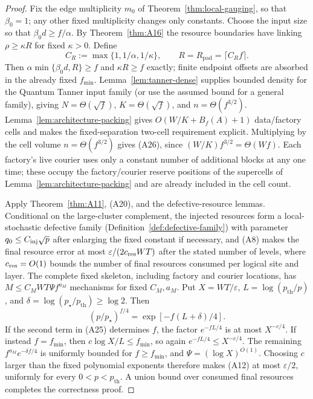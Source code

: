 \documentclass[aps,prx,reprint,superscriptaddress,nofootinbib,floatfix,longbibliography]{revtex4-2}
\theoremstyle{definition}
\begin{document}
\begin{proof}
Fix the edge multiplicity $m_0$ of Theorem~\ref{thm:local-gauging}, so that
$\beta_0=1$; any other fixed multiplicity changes only constants.  Choose the
input size so that $\beta_0d\ge f/\alpha$.  By
Theorem~\ref{thm:A16} the resource boundaries have linking
$\rho\geq\kappa R$ for fixed $\kappa>0$.  Define
\begin{equation*}
 C_R:=\max\{1,1/\alpha,1/\kappa\},\qquad
 R=R_{\mathrm{pad}}=\lceil C_R f\rceil .
\end{equation*}
Then $\alpha\min\{\beta_0d,R\}\ge f$ and $\kappa R\ge f$
exactly; finite endpoint offsets are absorbed in the already fixed
$f_{\min}$.
  Lemma~\ref{lem:tanner-dense} supplies bounded density for the
Quantum Tanner input family (or use the assumed bound for a general family),
giving $N=\Theta(\sqrt f)$, $K=\Theta(\sqrt f)$, and
$n=\Theta(f^{3/2})$.  Lemma~\ref{lem:architecture-packing} gives
$O(W/K+B_f(A)+1)$ data/factory cells and makes the fixed-separation two-cell
requirement explicit.  Multiplying by the cell volume $n=\Theta(f^{3/2})$
gives (A26), since $(W/K)f^{3/2}=\Theta(Wf)$.  Each factory's live courier uses only
a constant number of additional blocks at any one time; these occupy the
factory/courier reserve positions of the supercells of
Lemma~\ref{lem:architecture-packing} and are already included in the cell count.

Apply Theorem~\ref{thm:A11}, (A20), and the defective-resource lemmas.
Conditional on the large-cluster complement, the injected resources form a
local-stochastic defective family (Definition~\ref{def:defective-family})
with parameter $q_0\le C_{\rm inj}\sqrt p$ after enlarging the fixed constant
if necessary, and (A8) makes the final resource error at most
$\varepsilon/(2c_{\rm res}WT)$ after the stated number of levels, where
$c_{\rm res}=O(1)$ bounds the number of final resources consumed per logical
site and layer.  The complete
fixed skeleton, including factory and courier locations, has
$M\leq C_MWT\Psi f^{a_M}$ mechanisms for fixed $C_M,a_M$.  Put
$X=WT/\varepsilon$, $L=\log(p_{\mathrm{th}}/p)$, and
$\delta=\log(p_\star/p_{\mathrm{th}})\geq\log2$.  Then
\begin{equation}
 (p/p_\star)^{f/4}=\exp[-f(L+\delta)/4].                            \tag{A28}
\end{equation}
If the second term in (A25) determines $f$, the factor $e^{-fL/4}$
is at most $X^{-c/4}$.  If instead $f=f_{\min}$, then
$c\log X/L\leq f_{\min}$, so again $e^{-fL/4}\leq X^{-c/4}$.
The remaining $f^{a_M} e^{-\delta f/4}$ is uniformly bounded for
$f\geq f_{\min}$, and $\Psi=(\log X)^{O(1)}$.  Choosing $c$ larger than
the fixed polynomial exponents therefore makes (A12) at most
$\varepsilon/2$, uniformly for every $0<p<p_{\mathrm{th}}$.  A union bound over
consumed final resources completes the correctness proof.


\end{proof}
\end{document}
